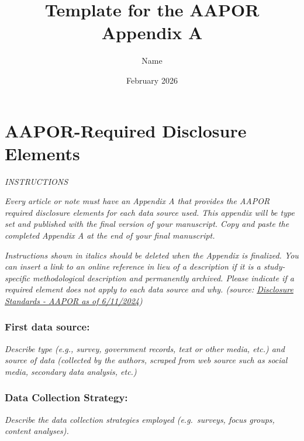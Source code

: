 \documentclass{article}
\title{Template for the AAPOR Appendix A}
\author{Name}
\date{February 2026}
\begin{document}
\maketitle


\renewcommand{\thesection}{\Alph{section}}

\appendix

\section{AAPOR-Required Disclosure Elements}

\begin{center}
    \textit{INSTRUCTIONS}
\end{center}

\textit{Every article or note must have an Appendix A that provides the AAPOR
    required disclosure elements for each data source used. This appendix will be
    type set and published with the final version of your manuscript. Copy and
    paste the completed Appendix A at the end of your final manuscript.}

\textit{Instructions shown in italics should be deleted when the Appendix is
    finalized. You can insert a link to an online reference in lieu of a
    description if it is a study-specific methodological description and
    permanently archived. Please indicate if a required element does not apply to
    each data source and why. (source:
    \href{https://aapor.org/standards-and-ethics/disclosure-standards}{Disclosure
        Standards - AAPOR as of 6/11/2024})
}

\subsubsection*{First data source:} \textit{Describe type (e.g., survey,
    government records, text or other media, etc.) and source of data (collected by
    the authors, scraped from web source such as social media, secondary data
    analysis, etc.)}

\subsubsection*{Data Collection Strategy:} \textit{Describe the data collection
    strategies employed (e.g.\ surveys, focus groups, content analyses).}
\end{document}
